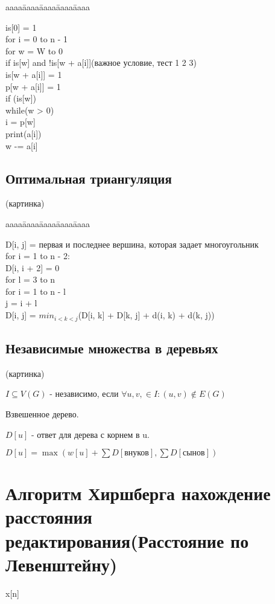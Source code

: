 \documentclass[12pt]{article}
\def\t{\texttt}
\newenvironment{MyTabbing}{
\t\bgroup
\begin{tabbing}
aaaa\=aaaa\=aaaa\=aaaa\=aaaa\kill
}{
\end{tabbing}
\t\egroup
}
\begin{document}
\begin{MyTabbing}
is[0] = 1\\
for i = 0 to n - 1\\
\>for w = W to 0\\
\>\>if is[w] and !is[w + a[i]](важное условие, тест 1 2 3)\\
\>\>\>is[w + a[i]] = 1\\
\>\>\>p[w + a[i]] = 1
\\
if (is[w])\\
\>while(w > 0)\\
\>\>i = p[w]\\
\>\>print(a[i])\\
\>\>w -= a[i]\\
\end{MyTabbing}

\subsection{Оптимальная триангуляция}
(картинка)
\begin{MyTabbing}
D[i, j] = первая и последнее вершина, которая задает многоугольник\\
for i = 1 to n - 2:\\
\>D[i, i + 2] = 0\\
for l = 3 to n\\
\>for i = 1 to n - l\\ 
\>\>j = i + l\\
\>\>D[i, j] = $min_{i < k < j}$(D[i, k]  + D[k, j] + d(i, k) + d(k, j))\\
\end{MyTabbing}

\subsection{Независимые множества в деревьях}
(картинка)

$I \subseteq V(G)$ - независимо, если $\forall u, v, \in I: (u, v) \notin E(G)$

Взвешенное дерево.

$D[u]$ - ответ для дерева с корнем в u.

$D[u] = \max (w[u] + \sum D[\text{внуков}], \sum D[\text{сынов}])$

\section{Алгоритм Хиршберга нахождение расстояния редактирования(Расстояние по Левенштейну)}
x[n]
\end{document}
